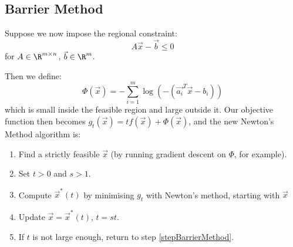 \documentclass[../Main.tex]{subfiles}
\begin{document}
\subsection{Barrier Method}
Suppose we now impose the regional constraint:
\begin{equation*}
    A \vec{x} - \vec{b} \leq 0
\end{equation*}
for $A \in \R^{m \times n}$, $\vec{b} \in \R^m$.

Then we define:
\begin{equation*}
    \Phi(\vec{x}) = -\sum_{i=1}^{m} \log(-(\vec{a_{i}}^T \vec{x} - b_i))
\end{equation*}
which is small inside the feasible region and large outside it. Our objective function then becomes $g_t(\vec{x}) = tf(\vec{x}) + \Phi(\vec{x})$, and the new Newton's Method algorithm is:
\begin{enumerate}
    \item Find a strictly feasible $\vec{x}$ (by running gradient descent on $\Phi$, for example).
    \item Set $t > 0$ and $s > 1$.
    \item Compute $\vec{x}^*(t)$ by minimising $g_t$ with Newton's method, starting with $\vec{x}$ \label{stepBarrierMethod}
    \item Update $\vec{x} = \vec{x}^*(t)$, $t = st$.
    \item If $t$ is not large enough, return to step \ref{stepBarrierMethod}.
\end{enumerate}
\end{document}
